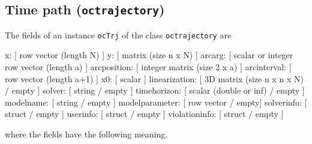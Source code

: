 \subsection{Time path (\texorpdfstring{\lstinline+octrajectory+}{octrajectory})}
The fields of an instance \lstinline+ocTrj+ of the class \lstinline+octrajectory+ are
\begin{matlab}
                 x: [ row vector (length N) ]
                 y: [ matrix (size n x N) ]
            arcarg: [ scalar or integer row vector (length a) ]
       arcposition: [ integer matrix (size 2 x a) ]
       arcinterval: [ row vector (length a+1) ]
                x0: [ scalar ]
     linearization: [ 3D matrix (size n x n x N) / empty ]
            solver: [ string / empty ]
       timehorizon: [ scalar (double or inf) / empty ]
         modelname: [ string / empty ]
    modelparameter: [ row vector / empty]
        solverinfo: [ struct / empty ]
          userinfo: [ struct / empty ]
     violationinfo: [ struct / empty ]
\end{matlab}
where the fields have the following meaning.
